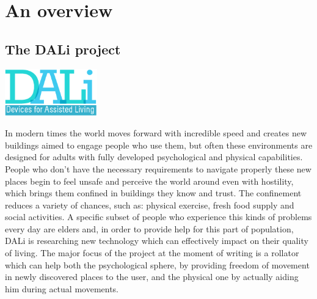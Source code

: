 \chapter{An overview}

\vspace{0.5cm}
\section{The DALi project}

\vspace{1cm}
\begin{center}
      \includegraphics[width=0.3\textwidth]{img/Dali-logo.png}
\end{center}
\vspace{1cm}

In modern times the world moves forward with incredible speed and creates new buildings aimed to engage people who use them, but often these environments are designed for adults with fully developed psychological and physical capabilities.
People who don't have the necessary requirements to navigate properly these new places begin to feel unsafe and perceive the world around even with hostility, which brings them confined in buildings they know and trust.
The confinement reduces a variety of chances, such as: physical exercise,
fresh food supply and social activities.
\newline
A specific subset of people who experience this kinds of problems every day are elders and, in order to provide help for this part of population, DALi is researching new technology which can effectively impact on their quality of living.
\newline
The major focus of the project at the moment of writing is a rollator which can help both the psychological sphere, by providing freedom of movement in newly discovered places to the user, and the physical one by actually aiding him during actual movements.

\newpage
